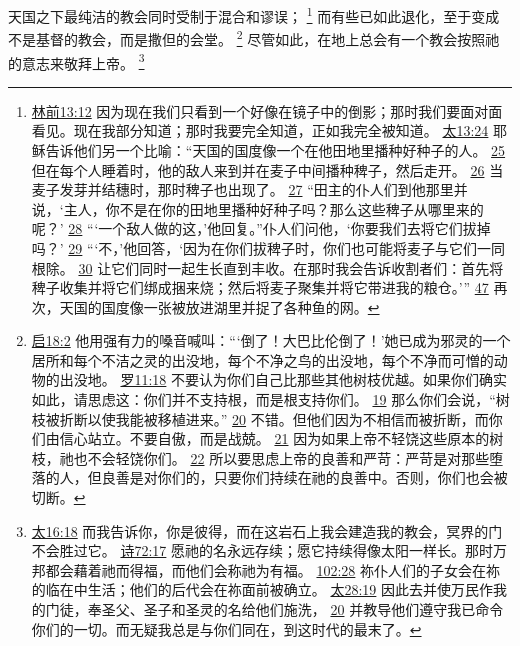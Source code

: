 \documentclass[12pt, a4paper, oneside]{ctexart}
\newcounter{parnum}[section]
\newcommand{\N}{%
   \noindent\refstepcounter{parnum}%
    \makebox[\parindent][l]{\textbf{\arabic{parnum}.}}}
\begin{document}
\N 天国之下最纯洁的教会同时受制于混合和谬误；
	\footnote {
		\href{https://biblehub.com/1_corinthians/13-12.htm}{林前13:12} 因为现在我们只看到一个好像在镜子中的倒影；那时我们要面对面看见。现在我部分知道；那时我要完全知道，正如我完全被知道。
		\href{https://biblehub.com/matthew/13-24.htm}{太13:24} 耶稣告诉他们另一个比喻：“天国的国度像一个在他田地里播种好种子的人。
        \href{https://biblehub.com/matthew/13-25.htm}{25} 但在每个人睡着时，他的敌人来到并在麦子中间播种稗子，然后走开。
        \href{https://biblehub.com/matthew/13-26.htm}{26} 当麦子发芽并结穗时，那时稗子也出现了。
        \href{https://biblehub.com/matthew/13-27.htm}{27} “田主的仆人们到他那里并说，‘主人，你不是在你的田地里播种好种子吗？那么这些稗子从哪里来的呢？’
        \href{https://biblehub.com/matthew/13-28.htm}{28} “‘一个敌人做的这，’他回复。”仆人们问他，‘你要我们去将它们拔掉吗？’
        \href{https://biblehub.com/matthew/13-29.htm}{29} “‘不，’他回答，‘因为在你们拔稗子时，你们也可能将麦子与它们一同根除。
        \href{https://biblehub.com/matthew/13-30.htm}{30} 让它们同时一起生长直到丰收。在那时我会告诉收割者们：首先将稗子收集并将它们绑成捆来烧；然后将麦子聚集并将它带进我的粮仓。’”
		\href{https://biblehub.com/matthew/13-47.htm}{47} 再次，天国的国度像一张被放进湖里并捉了各种鱼的网。
	}
	而有些已如此退化，至于变成不是基督的教会，而是撒但的会堂。
	\footnote {
		\href{https://biblehub.com/revelation/18-2.htm}{启18:2} 他用强有力的嗓音喊叫：“‘倒了！大巴比伦倒了！’她已成为邪灵的一个居所和每个不洁之灵的出没地，每个不净之鸟的出没地，每个不净而可憎的动物的出没地。
		\href{https://biblehub.com/romans/11-18.htm}{罗11:18} 不要认为你们自己比那些其他树枝优越。如果你们确实如此，请思虑这：你们并不支持根，而是根支持你们。
		\href{https://biblehub.com/romans/11-19.htm}{19} 那么你们会说，“树枝被折断以使我能被移植进来。”
		\href{https://biblehub.com/romans/11-20.htm}{20} 不错。但他们因为不相信而被折断，而你们由信心站立。不要自傲，而是战兢。
		\href{https://biblehub.com/romans/11-21.htm}{21} 因为如果上帝不轻饶这些原本的树枝，祂也不会轻饶你们。
        \href{https://biblehub.com/romans/11-22.htm}{22} 所以要思虑上帝的良善和严苛：严苛是对那些堕落的人，但良善是对你们的，只要你们持续在祂的良善中。否则，你们也会被切断。
	}
	尽管如此，在地上总会有一个教会按照祂的意志来敬拜上帝。
	\footnote {
		\href{https://biblehub.com/matthew/16-18.htm}{太16:18} 而我告诉你，你是彼得，而在这岩石上我会建造我的教会，冥界的门不会胜过它。
		\href{https://biblehub.com/psalms/72-17.htm}{诗72:17} 愿祂的名永远存续；愿它持续得像太阳一样长。那时万邦都会藉着祂而得福，而他们会称祂为有福。
		\href{https://biblehub.com/psalms/102-28.htm}{102:28} 祢仆人们的子女会在祢的临在中生活；他们的后代会在祢面前被确立。
		\href{https://biblehub.com/matthew/28-19.htm}{太28:19} 因此去并使万民作我的门徒，奉圣父、圣子和圣灵的名给他们施洗，
		\href{https://biblehub.com/matthew/28-20.htm}{20} 并教导他们遵守我已命令你们的一切。而无疑我总是与你们同在，到这时代的最末了。
	}
\end{document}
